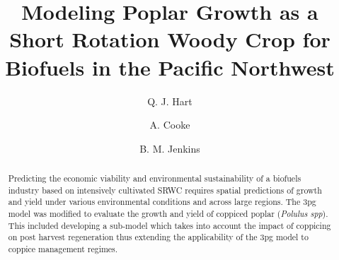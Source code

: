 \documentclass[preprint,12pt]{elsarticle}
\begin{document}
\begin{frontmatter}



\title{Modeling Poplar Growth as a Short Rotation Woody Crop for Biofuels in the Pacific Northwest}


\author[lawr]{Q. J. Hart}
\author[pfc]{A. Cooke}
\author[bioag]{B. M. Jenkins}

\address{Department of Land, Air, and Water, University of California, Davis, USA}
\address{Precision Forestry Cooperative, University of Washington, USA}
\address{Department of Biological and Agricultural Engineering, University of California, Davis, USA}

\begin{abstract}
  Predicting the economic viability and environmental sustainability
  of a biofuels industry based on intensively cultivated \acf{SRWC} requires spatial
  predictions of growth and yield under various
  environmental conditions and across large regions.  The \acf{3pg}
  model was modified to evaluate the growth and yield of coppiced
  poplar (\emph{Polulus spp}).  This included developing a sub-model 
  which takes into account the impact of coppicing on post harvest
  regeneration thus extending the applicability of the \acf{3pg} model
  to coppice management regimes.


\end{abstract}
\end{frontmatter}
\end{document}
